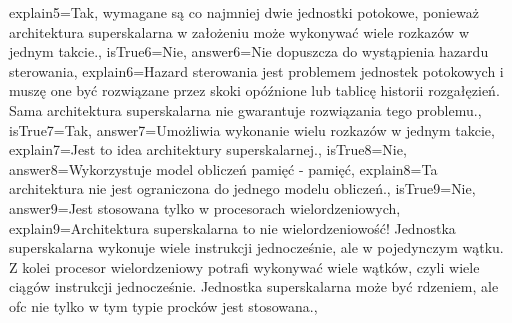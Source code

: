 \begin{enumerate}
\begin{minipage}{\textwidth}
{		explain5={Tak, wymagane są co najmniej dwie jednostki potokowe, ponieważ architektura superskalarna w założeniu może wykonywać wiele rozkazów w jednym takcie.},%
		isTrue6={Nie},%
		answer6={Nie dopuszcza do wystąpienia hazardu sterowania},%
		explain6={Hazard sterowania jest problemem jednostek potokowych i muszę one być rozwiązane przez skoki opóźnione lub tablicę historii rozgałęzień. Sama architektura superskalarna nie gwarantuje rozwiązania tego problemu.},%
		isTrue7={Tak},%
		answer7={Umożliwia wykonanie wielu rozkazów w jednym takcie},%
		explain7={Jest to idea architektury superskalarnej.},%
		isTrue8={Nie},%
		answer8={Wykorzystuje model obliczeń pamięć - pamięć},%
		explain8={Ta architektura nie jest ograniczona do jednego modelu obliczeń.},%
		isTrue9={Nie},%
		answer9={Jest stosowana tylko w procesorach wielordzeniowych},%
		explain9={Architektura superskalarna to nie wielordzeniowość! Jednostka superskalarna wykonuje wiele instrukcji jednocześnie, ale w pojedynczym wątku. Z kolei procesor wielordzeniowy potrafi wykonywać wiele wątków, czyli wiele ciągów instrukcji jednocześnie. Jednostka superskalarna może być rdzeniem, ale ofc nie tylko w tym typie procków jest stosowana.},%
	}
\end{minipage}
\begin{minipage}{\textwidth}
\end{minipage}
\begin{minipage}{\textwidth}

\end{minipage}
\end{enumerate}
